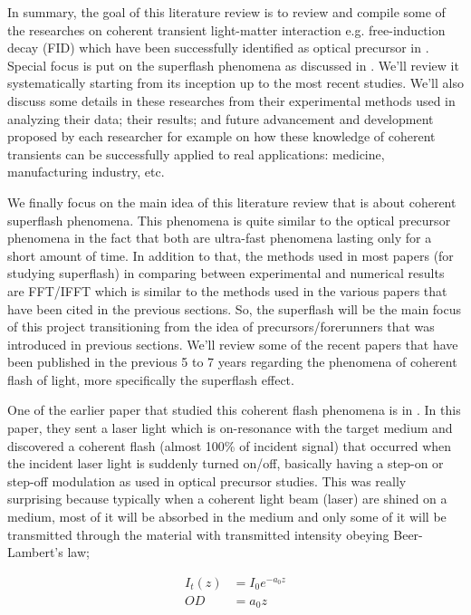 In summary, the goal of this literature review is to review and compile some of the researches on coherent transient light-matter interaction e.g. free-induction decay (FID) which have been successfully identified as optical precursor in . Special focus is put on the superflash phenomena as discussed in . We'll review it systematically starting from its inception up to the most recent studies. We'll also discuss some details in these researches from their experimental methods used in analyzing their data; their results; and future advancement and development proposed by each researcher for example on how these knowledge of coherent transients can be successfully applied to real applications: medicine, manufacturing industry, etc.

We finally focus on the main idea of this literature review that is about coherent superflash phenomena. This phenomena is quite similar to the optical precursor phenomena in the fact that both are ultra-fast phenomena lasting only for a short amount of time. In addition to that, the methods used in most papers (for studying superflash) in comparing between experimental and numerical results are FFT/IFFT which is similar to the methods used in the various papers that have been cited in the previous sections. So, the superflash will be the main focus of this project transitioning from the idea of precursors/forerunners that was introduced in previous sections. We'll review some of the recent papers that have been published in the previous 5 to 7 years regarding the phenomena of coherent flash of light, more specifically the superflash effect.

One of the earlier paper that studied this coherent flash phenomena is in . In this paper, they sent a laser light which is on-resonance with the target medium and discovered a coherent flash (almost 100\% of incident signal) that occurred when the incident laser light is suddenly turned on/off, basically having a step-on or step-off modulation as used in optical precursor studies. This was really surprising because typically when a coherent light beam (laser) are shined on a medium, most of it will be absorbed in the medium and only some of it will be transmitted through the material with transmitted intensity obeying Beer-Lambert's law;

\begin{align}
    I_{t}(z) &= I_{0} e^{-a_{0} z}\\
    OD &= a_{0} z
\end{align}

